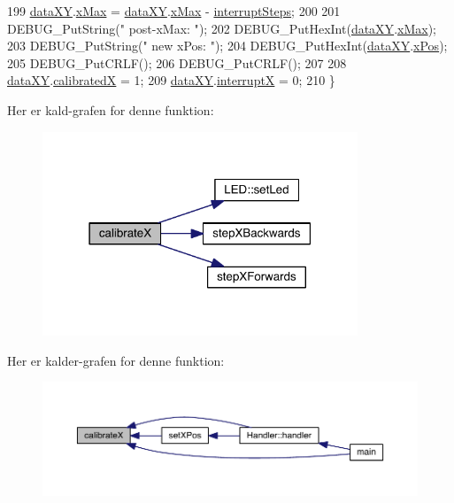 \begin{DoxyCode}
199   \hyperlink{data_8h_a89d7998a721b3f36f9f4131e7a5e42d2}{dataXY}.\hyperlink{data_8h_a5b6ae90a32a5f290afcc50656befceca}{xMax} = \hyperlink{data_8h_a89d7998a721b3f36f9f4131e7a5e42d2}{dataXY}.\hyperlink{data_8h_a5b6ae90a32a5f290afcc50656befceca}{xMax} - \hyperlink{xy_8h_a319d8f8cbb816fc1ca2306587712b0b7}{interruptSteps};
200   
201   DEBUG\_PutString(\textcolor{stringliteral}{" post-xMax: "});
202   DEBUG\_PutHexInt(\hyperlink{data_8h_a89d7998a721b3f36f9f4131e7a5e42d2}{dataXY}.\hyperlink{data_8h_a5b6ae90a32a5f290afcc50656befceca}{xMax});
203   DEBUG\_PutString(\textcolor{stringliteral}{" new xPos: "});
204   DEBUG\_PutHexInt(\hyperlink{data_8h_a89d7998a721b3f36f9f4131e7a5e42d2}{dataXY}.\hyperlink{data_8h_a5262e09f478a571552e65be75c506bdb}{xPos});
205   DEBUG\_PutCRLF();
206   DEBUG\_PutCRLF();
207   
208   \hyperlink{data_8h_a89d7998a721b3f36f9f4131e7a5e42d2}{dataXY}.\hyperlink{data_8h_a20403c23f502143a2dd7ee5bb641c0ab}{calibratedX} = 1;
209   \hyperlink{data_8h_a89d7998a721b3f36f9f4131e7a5e42d2}{dataXY}.\hyperlink{data_8h_a4cacb2964bb4b589bf79aa64a398725b}{interruptX} = 0;
210 \}
\end{DoxyCode}


Her er kald-\/grafen for denne funktion\+:\nopagebreak
\begin{figure}[H]
\begin{center}
\leavevmode
\includegraphics[width=267pt]{db/d87/class_x_y_a852d7d757cec8e85e0b436969d0ce237_cgraph}
\end{center}
\end{figure}




Her er kalder-\/grafen for denne funktion\+:\nopagebreak
\begin{figure}[H]
\begin{center}
\leavevmode
\includegraphics[width=350pt]{db/d87/class_x_y_a852d7d757cec8e85e0b436969d0ce237_icgraph}
\end{center}
\end{figure}


